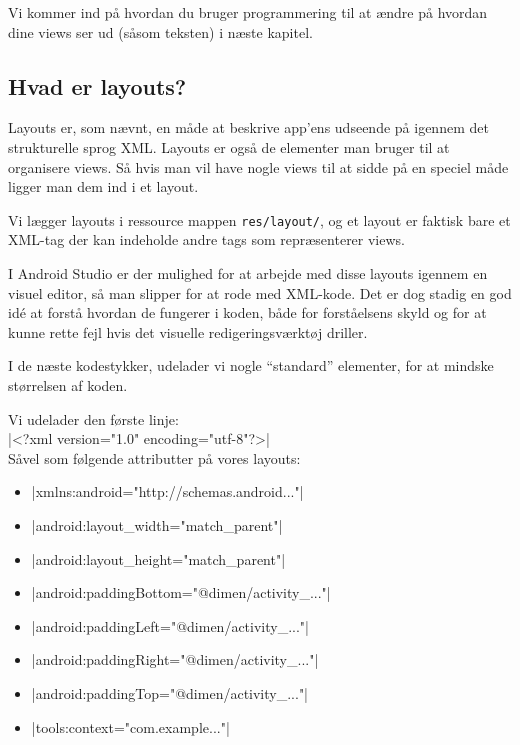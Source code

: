 Vi kommer ind på hvordan du bruger programmering til at ændre på hvordan dine views ser ud (såsom teksten) i næste kapitel.

\subsection{Hvad er layouts?}
Layouts er, som nævnt, en måde at beskrive app'ens udseende på igennem det strukturelle sprog XML. Layouts er også de elementer man bruger til at organisere views. Så hvis man vil have nogle views til at sidde på en speciel måde ligger man dem ind i et layout.

Vi lægger layouts i ressource mappen \texttt{res/layout/}, og et layout er 
faktisk bare et XML-tag der kan indeholde andre tags som repræsenterer views.

I Android Studio er der mulighed for at arbejde med disse layouts igennem en 
visuel editor, så man slipper for at rode med XML-kode. Det er dog stadig en 
god idé at forstå hvordan de fungerer i koden, både for forståelsens skyld og 
for at kunne rette fejl hvis det visuelle redigeringsværktøj driller.

\begin{remark}
	I de næste kodestykker, udelader vi nogle ``standard'' elementer, for at mindske størrelsen af koden.
	
	Vi udelader den første linje: \\
	\XmlInline|<?xml version="1.0" encoding="utf-8"?>|\\
	Såvel som følgende attributter på vores layouts:
	\begin{itemize}
		\item \XmlInline|xmlns:android="http://schemas.android..."|
		\item \XmlInline|android:layout_width="match_parent"|
		\item \XmlInline|android:layout_height="match_parent"|
		\item \XmlInline|android:paddingBottom="@dimen/activity_..."|
		\item \XmlInline|android:paddingLeft="@dimen/activity_..."|
		\item \XmlInline|android:paddingRight="@dimen/activity_..."|
		\item \XmlInline|android:paddingTop="@dimen/activity_..."|
		\item \XmlInline|tools:context="com.example..."|
	\end{itemize}
\end{remark}

